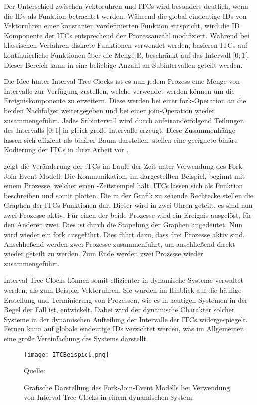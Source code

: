 Der Unterschied zwischen Vektoruhren und ITCs wird besonders deutlich, wenn die IDs als Funktion betrachtet werden.
Während die global eindeutige IDs von Vektoruhren einer konstanten vordefinierten Funktion entspricht, wird die ID Komponente der ITCs entsprechend der Prozessanzahl modifiziert.
Während bei klassischen Verfahren diskrete Funktionen verwendet werden, basieren ITCs auf kontinuierliche Funktionen über die Menge $\mathbb{R}$, beschränkt auf das Intervall $[0;1[$.
Dieser Bereich kann in eine beliebige Anzahl an Subintervallen geteilt werden.

Die Idee hinter Interval Tree Clocks ist es nun jedem Prozess eine Menge von Intervalle zur Verfügung zustellen, welche verwendet werden können um die Ereigniskomponente zu erweitern.
Diese werden bei einer fork-Operation an die beiden Nachfolger weitergegeben und bei einer join-Operation wieder zusammengeführt.
Jedes Subintervall wird durch aufeinanderfolgend Teilungen des Intervalls $[0;1[$ in gleich große Intervalle erzeugt.
Diese Zusammenhänge lassen sich effizient als binärer Baum darstellen.
 stellen eine geeignete binäre Kodierung der ITCs in ihrer Arbeit vor \cite{almeida2008treeclocks}.

 zeigt die Veränderung der ITCs im Laufe der Zeit unter Verwendung des Fork-Join-Event-Modell.
Die Kommunikation, im dargestellten Beispiel, beginnt mit einem Prozesse, welcher einen -Zeitstempel hält.
ITCs lassen sich als Funktion beschreiben und somit plotten.
Die in der Grafik zu sehende Rechtecke stellen die Graphen der ITCs Funktionen dar.
Dieser wird in zwei Uhren geteilt, es sind nun zwei Prozesse aktiv.
Für einen der beide Prozesse wird ein Ereignis ausgelöst, für den Anderen zwei.
Dies ist durch die Stapelung der Graphen angedeutet.
Nun wird wieder ein fork ausgeführt. Dies führt dazu, dass drei Prozesse aktiv sind.
Anschließend werden zwei Prozesse zusammenführt, um anschließend direkt wieder geteilt zu werden.
Zum Ende werden zwei Prozesse wieder zusammengeführt.

Interval Tree Clocks können somit effizienter in dynamische Systeme verwaltet werden, als zum Beispiel Vektoruhren.
Sie wurden im Hinblick auf die häufige Erstellung und Terminierung von Prozessen, wie es in heutigen Systemen in der Regel der Fall ist, entwickelt.
Dabei wird der dynamische Charakter solcher Systeme in der dynamischen Aufteilung der Intervalle der ITCs widergespiegelt.
Fernen kann auf globale eindeutige IDs verzichtet werden, was im Allgemeinen eine große Vereinfachung des Systems darstellt.

\begin{figure}[ht]
    \centering
    \texttt{[image: ITCBeispiel.png]}
    \caption[Fork-Join-Event-Modell von Interval Tree Clocks]{Grafische Darstellung des Fork-Join-Event Modells bei Verwendung von Interval Tree Clocks in einem dynamischen System.}
    Quelle: \cite{almeida2008treeclocks}
    \label{fig:itcBsp}
\end{figure} 





